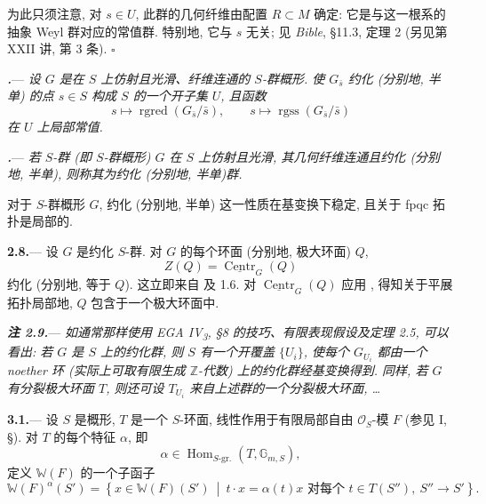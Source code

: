 为此只须注意, 对 \(s\in U\), 此群的几何纤维由配置 \(R\subset M\) 确定: 它是与这一根系的抽象 Weyl 群对应的常值群. 特别地, 它与 \(s\) 无关; 见 \emph{Bible}, §11.3, 定理 2 (另见第 XXII 讲, 第 3 条).
\hfill\(\square\)

\par\medskip\noindent
\textbf{\textit{.}}---
\textit{设 \(G\) 是在 \(S\) 上仿射且光滑、纤维连通的 \(S\)-群概形. 使 \(G_{\bar s}\) 约化 \textup{(分别地, 半单)} 的点 \(s\in S\) 构成 \(S\) 的一个开子集 \(U\), 且函数}
\[
  s\longmapsto\operatorname{rgred}(G_{\bar s}/\bar s),
  \qquad
  s\longmapsto\operatorname{rgss}(G_{\bar s}/\bar s)
\]
\textit{在 \(U\) 上局部常值.}

\par\medskip\noindent
\textbf{\textit{.}}---
\textit{若 \(S\)-群 \textup{(即 \(S\)-群概形)} \(G\) 在 \(S\) 上仿射且光滑, 其几何纤维连通且约化 \textup{(分别地, 半单)}, 则称其为\emph{约化} \textup{(分别地, \emph{半单})}群.}

对于 \(S\)-群概形 \(G\), 约化 (分别地, 半单) 这一性质在基变换下稳定, 且关于 fpqc 拓扑是局部的.

\par\medskip\noindent
\textbf{2.8.}---
设 \(G\) 是约化 \(S\)-群. 对 \(G\) 的每个环面 (分别地, 极大环面) \(Q\),
\[
  Z(Q)=\underline{\operatorname{Centr}}_G(Q)
\]
约化 (分别地, 等于 \(Q\)). 这立即来自  及 1.6. 对 \(\underline{\operatorname{Centr}}_G(Q)\) 应用 , 得知关于平展拓扑局部地, \(Q\) 包含于一个极大环面中.

\par\medskip\noindent
\textbf{\textit{注 2.9.}}---
\textit{如通常那样使用 EGA IV\textsubscript{3}, §8 的技巧、有限表现假设及定理 2.5, 可以看出: 若 \(G\) 是 \(S\) 上的约化群, 则 \(S\) 有一个开覆盖 \(\{U_i\}\), 使每个 \(G_{U_i}\) 都由一个 noether 环 \textup{(实际上可取有限生成 \(\mathbb Z\)-代数)} 上的约化群经基变换得到. 同样, 若 \(G\) 有分裂极大环面 \(T\), 则还可设 \(T_{U_i}\) 来自上述群的一个分裂极大环面, \ldots}


\par\medskip\noindent
\textbf{3.1.}---
设 \(S\) 是概形, \(T\) 是一个 \(S\)-环面, 线性作用于有限局部自由 \(\mathcal O_S\)-模 \(F\) (参见 I, §). 对 \(T\) 的每个特征 \(\alpha\), 即
\[
  \alpha\in
  \operatorname{Hom}_{S\text{-gr.}}(T,\mathbb G_{m,S}),
\]
定义 \(\mathbb W(F)\) 的一个子函子
\[
  \mathbb W(F)^\alpha(S')
  =
  \left\{
    x\in\mathbb W(F)(S')
    \ \middle|\
    t\cdot x=\alpha(t)x
    \text{ 对每个 }t\in T(S''),\ S''\to S'
  \right\}.
\]

